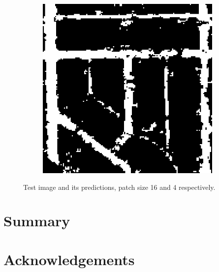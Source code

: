 \documentclass[10pt,conference,compsocconf]{IEEEtran}
\begin{document}
\begin{figure}
\begin{subfigure}[b]{0.15\textwidth}
	\end{subfigure}
	\begin{subfigure}[b]{0.15\textwidth}
		\includegraphics[width=\textwidth]{images/visualize_pred/pred_patch_10.png}
	\end{subfigure}
	\caption{Test image and its predictions, patch size 16 and 4 respectively.}
	\label{fig:animals}
\end{figure}

\section{Summary}




\section*{Acknowledgements}




\end{document}
